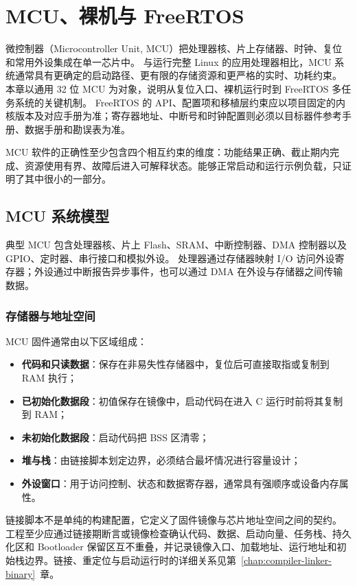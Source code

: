 \chapter{MCU、裸机与 FreeRTOS}
\label{chap:mcu-freertos}

微控制器（Microcontroller Unit, MCU）把处理器核、片上存储器、时钟、复位和常用外设集成在单一芯片中。
与运行完整 Linux 的应用处理器相比，MCU 系统通常具有更确定的启动路径、更有限的存储资源和更严格的实时、功耗约束。
本章以通用 32 位 MCU 为对象，说明从复位入口、裸机运行时到 FreeRTOS 多任务系统的关键机制。
FreeRTOS 的 API、配置项和移植层约束应以项目固定的内核版本及对应手册为准\cite{freertos-kernel-book,freertos-reference}；寄存器地址、中断号和时钟配置则必须以目标器件参考手册、数据手册和勘误表为准。

MCU 软件的正确性至少包含四个相互约束的维度：功能结果正确、截止期内完成、资源使用有界、故障后进入可解释状态。能够正常启动和运行示例负载，只证明了其中很小的一部分。

\section{MCU 系统模型}

典型 MCU 包含处理器核、片上 Flash、SRAM、中断控制器、DMA 控制器以及 GPIO、定时器、串行接口和模拟外设。
处理器通过存储器映射 I/O 访问外设寄存器；外设通过中断报告异步事件，也可以通过 DMA 在外设与存储器之间传输数据。

\subsection{存储器与地址空间}

MCU 固件通常由以下区域组成：
\begin{itemize}
  \item \textbf{代码和只读数据}：保存在非易失性存储器中，复位后可直接取指或复制到 RAM 执行；
  \item \textbf{已初始化数据段}：初值保存在镜像中，启动代码在进入 C 运行时前将其复制到 RAM；
  \item \textbf{未初始化数据段}：启动代码把 BSS 区清零；
  \item \textbf{堆与栈}：由链接脚本划定边界，必须结合最坏情况进行容量设计；
  \item \textbf{外设窗口}：用于访问控制、状态和数据寄存器，通常具有强顺序或设备内存属性。
\end{itemize}

链接脚本不是单纯的构建配置，它定义了固件镜像与芯片地址空间之间的契约。
工程至少应通过链接期断言或镜像检查确认代码、数据、启动向量、任务栈、持久化区和 Bootloader 保留区互不重叠，并记录镜像入口、加载地址、运行地址和初始栈边界。链接、重定位与启动运行时的详细关系见第~\ref{chap:compiler-linker-binary}~章。

